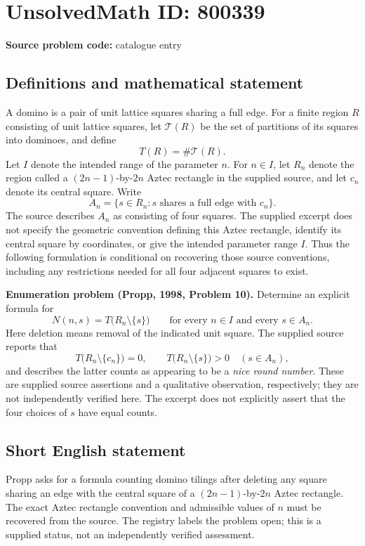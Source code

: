 \documentclass[11pt]{article}
\begin{document}
\section*{UnsolvedMath ID: 800339}
\textbf{Source problem code:} catalogue entry
\subsection{Definitions and mathematical statement}
A domino is a pair of unit lattice squares sharing a full edge. For a finite region \(R\) consisting of unit lattice squares, let \(\mathcal{T}(R)\) be the set of partitions of its squares into dominoes, and define
\[
T(R)=\#\mathcal{T}(R).
\]
Let \(I\) denote the intended range of the parameter \(n\). For \(n\in I\), let \(R_n\) denote the region called a \((2n-1)\)-by-\(2n\) Aztec rectangle in the supplied source, and let \(c_n\) denote its central square. Write
\[
A_n=\{s\in R_n:s\text{ shares a full edge with }c_n\}.
\]
The source describes \(A_n\) as consisting of four squares. The supplied excerpt does not specify the geometric convention defining this Aztec rectangle, identify its central square by coordinates, or give the intended parameter range \(I\). Thus the following formulation is conditional on recovering those source conventions, including any restrictions needed for all four adjacent squares to exist.

\textbf{Enumeration problem (Propp, 1998, Problem 10).} Determine an explicit formula for
\[
N(n,s)=T\bigl(R_n\setminus\{s\}\bigr)
\qquad\text{for every }n\in I\text{ and every }s\in A_n.
\]
Here deletion means removal of the indicated unit square. The supplied source reports that
\[
T\bigl(R_n\setminus\{c_n\}\bigr)=0,
\qquad
T\bigl(R_n\setminus\{s\}\bigr)>0\quad(s\in A_n),
\]
and describes the latter counts as appearing to be a \emph{nice round number}. These are supplied source assertions and a qualitative observation, respectively; they are not independently verified here. The excerpt does not explicitly assert that the four choices of \(s\) have equal counts.
\subsection{Short English statement}
Propp asks for a formula counting domino tilings after deleting any square sharing an edge with the central square of a \((2n-1)\)-by-\(2n\) Aztec rectangle. The exact Aztec rectangle convention and admissible values of \(n\) must be recovered from the source. The registry labels the problem open; this is a supplied status, not an independently verified assessment.
\end{document}
